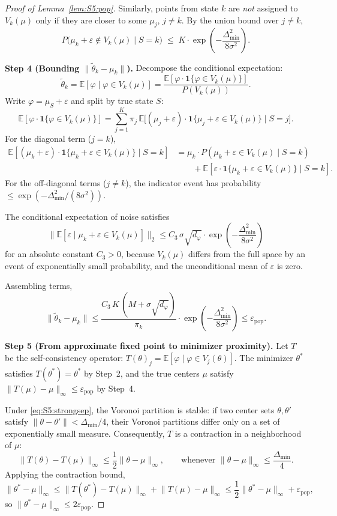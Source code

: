 \documentclass[twoside]{article}
\theoremstyle{plain}
\theoremstyle{definition}
\theoremstyle{remark}
\newcommand{\E}{\mathbb{E}}
\newcommand{\1}{\mathbf{1}}
\renewcommand{\epsilon}{\varepsilon}
\renewcommand{\phi}{\varphi}
\newcommand{\ttheta}{\tilde{\theta}}
\newcommand{\muk}{\mu_k}
\newcommand{\norm}[1]{\lVert#1\rVert}
\newcommand{\ind}{\mathbf{1}}
\begin{document}
\begin{proof}[Proof of Lemma~\ref{lem:S5:pop}]
Similarly, points from state $k$ are \emph{not} assigned to $V_k(\mu)$
only if they are closer to some $\mu_j$, $j\neq k$.  By the union bound
over $j\neq k$,
\[
P\bigl(\mu_k+\varepsilon\notin V_k(\mu)\mid S=k\bigr)
\;\le\; K\cdot\exp\!\left(-\frac{\Delta_{\min}^2}{8\sigma^2}\right).
\]

\noindent\textbf{Step 4 (Bounding $\norm{\ttheta_k-\muk}$).}
Decompose the conditional expectation:
\[
\ttheta_k = \E[\phi\mid\phi\in V_k(\mu)]
          = \frac{\E[\phi\cdot\ind\{\phi\in V_k(\mu)\}]}
                 {P(V_k(\mu))}.
\]
Write $\phi=\mu_S+\varepsilon$ and split by true state $S$:
\[
\E[\phi\cdot\ind\{\phi\in V_k(\mu)\}]
= \sum_{j=1}^K \pi_j\,
  \E\bigl[(\mu_j+\varepsilon)\cdot\ind\{\mu_j+\varepsilon\in V_k(\mu)\}\mid S=j\bigr].
\]
For the diagonal term ($j=k$),
\begin{align*}
\E[(\mu_k+\varepsilon)\cdot\ind\{\mu_k+\varepsilon\in V_k(\mu)\}\mid S=k]
&= \muk\cdot P(\mu_k+\varepsilon\in V_k(\mu)\mid S=k) \\
&\qquad + \E[\varepsilon\cdot\ind\{\mu_k+\varepsilon\in V_k(\mu)\}\mid S=k].
\end{align*}
For the off-diagonal terms ($j\neq k$), the indicator event has
probability $\le\exp(-\Delta_{\min}^2/(8\sigma^2))$.

The conditional expectation of noise satisfies
\[
\norm{\E[\varepsilon\mid\mu_k+\varepsilon\in V_k(\mu)]}_2
\le C_3\,\sigma\sqrt{d_\phi}\cdot\exp\!\left(-\frac{\Delta_{\min}^2}{8\sigma^2}\right)
\]
for an absolute constant $C_3>0$, because $V_k(\mu)$ differs from the
full space by an event of exponentially small probability, and the
unconditional mean of $\varepsilon$ is zero.

Assembling terms,
\[
\norm{\ttheta_k-\muk}
\le \frac{C_3\,K\,(M+\sigma\sqrt{d_\phi})}{\pi_k}
    \cdot\exp\!\left(-\frac{\Delta_{\min}^2}{8\sigma^2}\right)
\le \epsilon_{\mathrm{pop}}.
\]

\noindent\textbf{Step 5 (From approximate fixed point to minimizer proximity).}
Let $T$ be the self-consistency operator:
$T(\theta)_j=\E[\phi\mid\phi\in V_j(\theta)]$.  The minimizer $\theta^*$
satisfies $T(\theta^*)=\theta^*$ by Step~2, and the true centers $\mu$
satisfy $\norm{T(\mu)-\mu}_\infty\le\epsilon_{\mathrm{pop}}$ by Step~4.

Under \eqref{eq:S5:strongsep}, the Voronoi partition is stable: if two
center sets $\theta,\theta'$ satisfy $\norm{\theta-\theta'}<\Delta_{\min}/4$,
their Voronoi partitions differ only on a set of exponentially small
measure.  Consequently, $T$ is a contraction in a neighborhood of $\mu$:
\[
\norm{T(\theta)-T(\mu)}_\infty \le \frac12\norm{\theta-\mu}_\infty,
\qquad \text{whenever } \norm{\theta-\mu}_\infty\le\frac{\Delta_{\min}}{4}.
\]
Applying the contraction bound,
\[
\norm{\theta^*-\mu}_\infty
\le \norm{T(\theta^*)-T(\mu)}_\infty
   + \norm{T(\mu)-\mu}_\infty
\le \frac12\norm{\theta^*-\mu}_\infty + \epsilon_{\mathrm{pop}},
\]
so $\norm{\theta^*-\mu}_\infty\le 2\epsilon_{\mathrm{pop}}$.


\end{proof}
\end{document}
